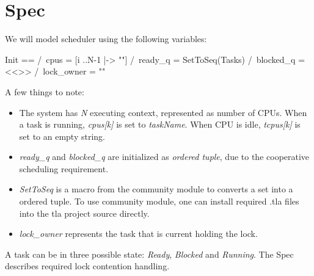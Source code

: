 \section{Spec}

We will model scheduler using the following variables:\newline
\begin{tla}
Init ==
    /\ cpus = [i ..N-1 |-> ""] 
    /\ ready_q = SetToSeq(Tasks)
    /\ blocked_q = <<>>
    /\ lock_owner = ""
\end{tla}
\begin{tlatex}
%
%
%
%
\end{tlatex}
\newline

A few things to note:
\begin{itemize}
    \item The system has \textit{N} executing context, represented as number of CPUs.
    When a task is running, \textit{cpus[k]} is set to \textit{taskName}. When CPU is idle,
    \textit{tcpus[k]} is set to an empty string. 
    \item \textit{ready\_q} and \textit{blocked\_q} are initialized as \textit{ordered tuple},
    due to the cooperative scheduling requirement.
    \item \textit{SetToSeq} is a macro from the community module \cite{tla_comm}
    to converts a set into a ordered tuple. To use community module, one can
    install required .tla files into the tla project source directly.
    \item \textit{lock\_owner} represents the task that is current holding the lock. 
\end{itemize}

A task can be in three possible state: \textit{Ready}, \textit{Blocked} and
\textit{Running}. The Spec describes required lock contention handling.\newline

